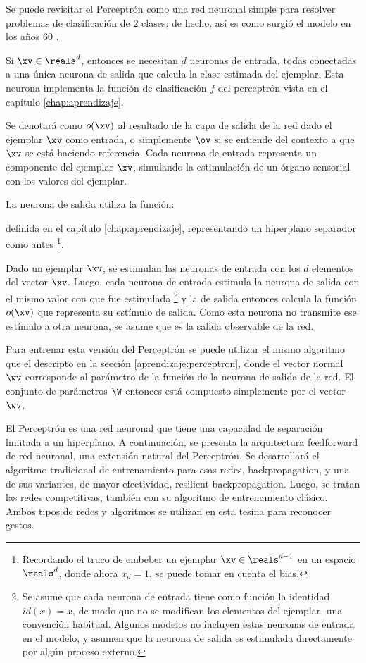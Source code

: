 Se puede revisitar el Perceptrón como una red neuronal simple para resolver problemas de clasificación de $2$ clases; de hecho, así es como surgió el modelo en los años 60 \cite{rosenblatt1958}. 

Si $\xv \in \reals^d$, entonces se necesitan $d$ neuronas de entrada, todas conectadas a una única neurona de salida que calcula la clase estimada del ejemplar. Esta neurona implementa la función de clasificación $f$ del perceptrón vista en el capítulo \ref{chap:aprendizaje}.

Se denotará como $o(\xv)$ al resultado de la capa de salida de la red dado el ejemplar $\xv$ como entrada, o simplemente $\ov$ si se entiende del contexto a que $\xv$ se está haciendo referencia. Cada neurona de entrada representa un componente del ejemplar $\xv$, simulando la estimulación de un órgano sensorial con los valores del ejemplar.

La neurona de salida utiliza la función:

definida en el capítulo \ref{chap:aprendizaje}, representando un hiperplano separador como antes \footnote{Recordando el truco de embeber un ejemplar $\xv \in \reals^{d-1}$ en un espacio $\reals^{d}$, donde ahora $x_{d}=1$, se puede tomar en cuenta el bias.}. 


Dado un ejemplar $\xv$, se estimulan las neuronas de entrada con los $d$ elementos del vector $\xv$. Luego, cada neurona de entrada estimula la neurona de salida con el mismo valor con que fue estimulada \footnote{Se asume que cada neurona de entrada tiene como función la identidad $id(x)=x$, de modo que no se modifican los elementos del ejemplar, una convención habitual. Algunos modelos no incluyen estas neuronas de entrada en el modelo, y asumen que la neurona de salida es estimulada directamente por algún proceso externo.} y la de salida entonces calcula la función $o(\xv)$ que representa su estímulo de salida. Como esta neurona no transmite ese estímulo a otra neurona, se asume que es la salida observable de la red.

Para entrenar esta versión del Perceptrón se puede utilizar el mismo algoritmo que el descripto en la sección \ref{aprendizaje:perceptron}, donde el vector normal $\wv$ corresponde al parámetro de la función de la neurona de salida de la red. El conjunto de parámetros $\W$ entonces está compuesto simplemente por el vector $\wv$.

El Perceptrón es una red neuronal que tiene una capacidad de separación limitada a un hiperplano. A continuación, se presenta la arquitectura feedforward de red neuronal, una extensión natural del Perceptrón. Se desarrollará el algoritmo tradicional de entrenamiento para esas redes, backpropagation, y una de sus variantes, de mayor efectividad, resilient backpropagation. Luego, se tratan las redes competitivas, también con su algoritmo de entrenamiento clásico. Ambos tipos de redes y algoritmos se utilizan en esta tesina para reconocer gestos.



